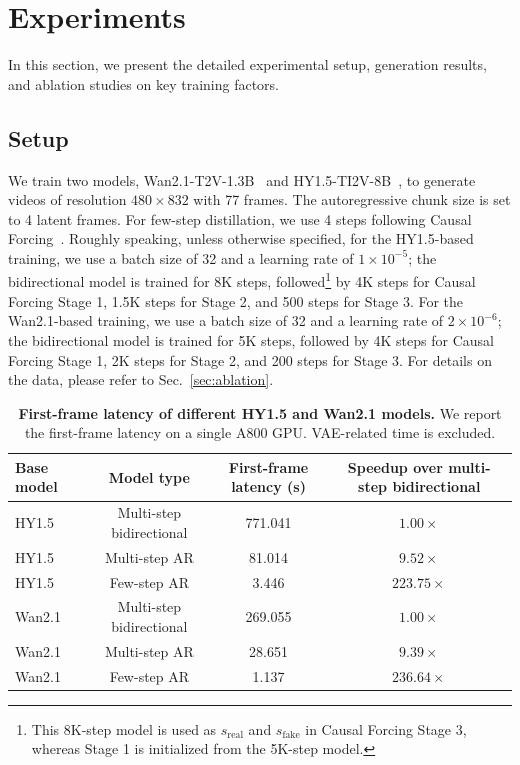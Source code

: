 \section{Experiments}
\label{sec:exp}

In this section, we present the detailed experimental setup, generation results, and ablation studies on key training factors.

\subsection{Setup}

We train two models, Wan2.1-T2V-1.3B~\cite{wan2025wan} and HY1.5-TI2V-8B~\cite{kong2024hunyuanvideo}, to generate videos of resolution $480\times 832$ with 77 frames. The autoregressive chunk size is set to 4 latent frames. For few-step distillation, we use 4 steps following Causal Forcing~\cite{zhu2026causal}. Roughly speaking, unless otherwise specified, for the HY1.5-based training, we use a batch size of 32 and a learning rate of $1\times 10^{-5}$; the bidirectional model is trained for 8K steps, followed\footnote{This 8K-step model is used as $s_{\text{real}}$ and $s_{\text{fake}}$ in Causal Forcing Stage 3, whereas Stage 1 is initialized from the 5K-step model.} by 4K steps for Causal Forcing Stage 1, 1.5K steps for Stage 2, and 500 steps for Stage 3. For the Wan2.1-based training, we use a batch size of 32 and a learning rate of $2\times 10^{-6}$; the bidirectional model is trained for 5K steps, followed by 4K steps for Causal Forcing Stage 1, 2K steps for Stage 2, and 200 steps for Stage 3. For details on the data, please refer to Sec.~\ref{sec:ablation}.


\begin{table}[t]
    \centering
    \caption{\textbf{First-frame latency of different HY1.5 and Wan2.1 models.} We report the first-frame latency on a single A800 GPU. VAE-related time is excluded.}
    \label{tab:latency}
    \begin{tabular}{lccc}
        \toprule
        Base model & Model type & First-frame latency (s) & Speedup over multi-step bidirectional \\
        \midrule
        HY1.5~\cite{kong2024hunyuanvideo} & Multi-step bidirectional & 771.041 & $1.00\times$ \\
        HY1.5 & Multi-step AR & 81.014 & $9.52\times$ \\
        HY1.5 & Few-step AR & 3.446 & $223.75\times$ \\
        \midrule
        Wan2.1 & Multi-step bidirectional & 269.055 & $1.00\times$ \\
        Wan2.1~\cite{wan2025wan} & Multi-step AR & 28.651 & $9.39\times$ \\
        Wan2.1 & Few-step AR & 1.137 & $236.64\times$ \\
        \bottomrule
    \end{tabular}
\end{table}


